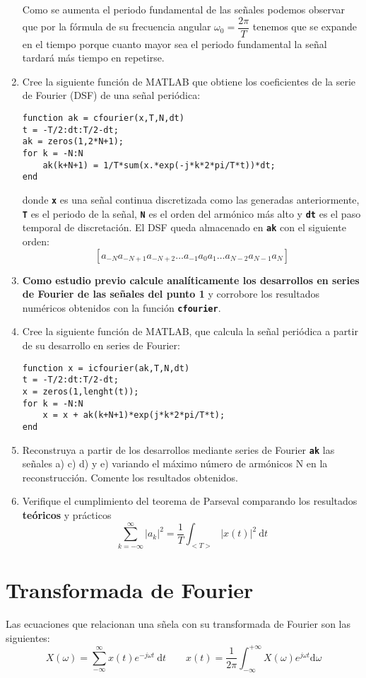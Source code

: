 \documentclass{article}
\newcommand{\code}[1]{\texttt{\textbf{#1}}}
\newcommand{\dt}{\:\mathrm{d}t}
\begin{document}
\begin{enumerate}[leftmargin=*]
	Como se aumenta el periodo fundamental de las señales podemos observar que por la fórmula de su frecuencia angular $\omega_0=\dfrac{2\pi}{T}$ tenemos que se expande en el tiempo porque cuanto mayor sea el periodo fundamental la señal tardará más tiempo en repetirse.
	
	\item Cree la siguiente función de MATLAB que obtiene los coeficientes de la serie de Fourier (DSF) de una señal periódica:
	
	\begin{lstlisting}
function ak = cfourier(x,T,N,dt)
t = -T/2:dt:T/2-dt;
ak = zeros(1,2*N+1);
for k = -N:N
	ak(k+N+1) = 1/T*sum(x.*exp(-j*k*2*pi/T*t))*dt;
end
	\end{lstlisting}
	
donde \code{x} es una señal continua discretizada como las generadas anteriormente, \code{T} es el periodo de la señal, \code{N} es el orden del armónico más alto y \code{dt} es el paso temporal de discretación. El DSF queda almacenado en \code{ak} con el siguiente orden: \[ \left[a_{-N}a_{-N+1}a_{-N+2}\dots a_{-1}a_0a_1\dots a_{N-2}a_{N-1}a_{N}\right] \]
\item \textbf{Como estudio previo calcule analíticamente los desarrollos en series de Fourier de las señales del punto 1} y corrobore los resultados numéricos obtenidos con la función \code{cfourier}.


\item Cree la siguiente función de MATLAB, que calcula la señal periódica a partir de su desarrollo en series de Fourier:

\begin{lstlisting}
function x = icfourier(ak,T,N,dt)
t = -T/2:dt:T/2-dt;
x = zeros(1,lenght(t));
for k = -N:N
	x = x + ak(k+N+1)*exp(j*k*2*pi/T*t);
end
\end{lstlisting}
\item Reconstruya a partir de los desarrollos mediante series de Fourier \code{ak} las señales a) c) d) y e) variando el máximo número de armónicos N en la reconstrucción. Comente los resultados obtenidos.

\item Verifique el cumplimiento del teorema de Parseval comparando los resultados \textbf{teóricos} y prácticos \[ \sum_{k=-\infty}^{\infty}|a_k|^2=\dfrac{1}{T}\int_{<T>}|x(t)|^2\dt \]
\end{enumerate}
\section{Transformada de Fourier}
Las ecuaciones que relacionan una sñela con su transformada de Fourier son las siguientes: \[ X(\omega)=\sum_{-\infty}^{\infty}x(t)e^{-j\omega t}\dt\qquad x(t)=\dfrac{1}{2\pi}\int_{-\infty}^{+\infty}X(\omega)e^{j\omega t}\mathrm{d}\omega \]
\end{document}
